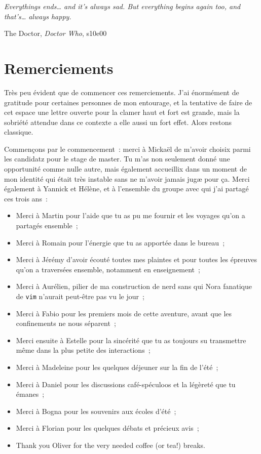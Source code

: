 \documentclass[../main/main.tex]{subfiles}
\begin{document}
\thispagestyle{empty}
\vspace*{\fill}
\epigraph{\openquote\textit{Everythings ends… and it's always sad. But
        everything begins again too, and that's… always happy.
\closequote}}{The Doctor, \textit{Doctor Who}, s10e00}
\vspace*{\fill}

\chapter*{Remerciements}

Très peu évident que de commencer ces remerciements. J'ai énormément de
gratitude pour certaines personnes de mon entourage, et la tentative de faire de
cet espace une lettre ouverte pour la clamer haut et fort est grande, mais la
sobriété attendue dans ce contexte a elle aussi un fort effet. Alors restons
classique.

Commençons par le commencement~: merci à Mickaël de m'avoir choisix parmi les
candidatz pour le stage de master. Tu m'as non seulement donné une opportunité
comme nulle autre, mais également accueillix dans un moment de mon identité qui
était très instable sans ne m'avoir jamais jugæ pour ça. Merci également à
Yannick et Hélène, et à l'ensemble du groupe avec qui j'ai partagé ces trois
ans~:
\begin{itemize}
    \item Merci à Martin pour l'aide que tu as pu me fournir et les voyages
        qu'on a partagés ensemble~;
    \item Merci à Romain pour l'énergie que tu as apportée dans le bureau~;
    \item Merci à Jérémy d'avoir écouté toutes mes plaintes et pour toutes les
        épreuves qu'on a traversées ensemble, notamment en enseignement~;
    \item Merci à Aurélien, pilier de ma construction de nerd sans qui Nora
        fanatique de \texttt{vim} n'aurait peut-être pas vu le jour~;
    \item Merci à Fabio pour les premiers mois de cette aventure, avant que les
        confinements ne nous séparent~;
    \item Merci ensuite à Estelle pour la sincérité que tu as toujours su
        transmettre même dans la plus petite des interactions~;
    \item Merci à Madeleine pour les quelques déjeuner sur la fin de l'été~;
    \item Merci à Daniel pour les discussions café-spéculoos et la légèreté que
        tu émanes~;
    \item Merci à Bogna pour les souvenirs aux écoles d'été~;
    \item Merci à Florian pour les quelques débats et précieux avis~;
    \item Thank you Oliver for the very needed coffee (or tea!) breaks.
\end{itemize}
\end{document}

